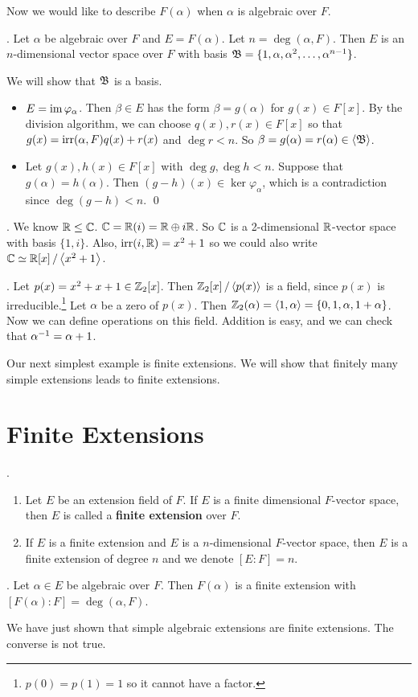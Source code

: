Now we would like to describe \(F(\alpha)\) when \(\alpha\) is algebraic over \(F\).

\thm. Let \(\alpha\) be algebraic over \(F\) and \(E = F(\alpha)\). Let \(n = \deg(\alpha, F)\). Then \(E\) is an \(n\)-dimensional vector space over \(F\) with basis \(\mathfrak{B} = \{1, \alpha, \alpha^2, \dots, \alpha^{n-1}\}\).

\pf We will show that \(\mathfrak{B}\) is a basis.
\begin{itemize}
    \item {} \(E = \operatorname{im} \varphi_\alpha\). Then \(\beta \in E\) has the form \(\beta = g(\alpha)\) for \(g(x) \in F[x]\). By the division algorithm, we can choose \(q(x), r(x) \in F[x]\) so that \(g(x) = \mathrm{irr}(\alpha, F) q(x) + r(x)\) and \(\deg r < n\). So \(\beta = g(\alpha) = r(\alpha) \in \left\langle \mathfrak{B} \right\rangle\).
    \item {} Let \(g(x), h(x) \in F[x]\) with \(\deg g, \deg h < n\). Suppose that \(g(\alpha) = h(\alpha)\). Then \((g-h)(x) \in \ker \varphi_\alpha\), which is a contradiction since \(\deg (g-h) < n\). \qed
\end{itemize}

\pagebreak

\ex. We know \(\mathbb{R} \leq \mathbb{C}\). \(\mathbb{C} = \mathbb{R}(i) = \mathbb{R} \oplus i\mathbb{R}\). So \(\mathbb{C}\) is a 2-dimensional \(\mathbb{R}\)-vector space with basis \(\{1, i\}\). Also, \(\mathrm{irr}(i, \mathbb{R}) = x^2 + 1\) so we could also write \(\mathbb{C} \simeq \mathbb{R}[x] \operatorname{/} \left\langle x^2 + 1 \right\rangle\).

\ex. Let \(p(x) = x^2 + x + 1 \in \mathbb{Z}_2[x]\). Then \(\mathbb{Z}_2[x] \operatorname{/} \left\langle p(x) \right\rangle\) is a field, since \(p(x)\) is irreducible.\footnote{\(p(0) = p(1) = 1\) so it cannot have a factor.} Let \(\alpha\) be a zero of \(p(x)\). Then \(\mathbb{Z}_2(\alpha) = \left\langle 1, \alpha \right\rangle = \left\{0, 1, \alpha, 1 + \alpha\right\}\). Now we can define operations on this field. Addition is easy, and we can check that \(\alpha^{-1} = \alpha + 1\).

\setcounter{topic}{30}

Our next simplest example is finite extensions. We will show that finitely many simple extensions leads to finite extensions.

\section*{Finite Extensions}

. 
\begin{enumerate}
    \item Let \(E\) be an extension field of \(F\). If \(E\) is a finite dimensional \(F\)-vector space, then \(E\) is called a \textbf{finite extension} over \(F\).

    \item If \(E\) is a finite extension and \(E\) is a \(n\)-dimensional \(F\)-vector space, then \(E\) is a finite extension of degree \(n\) and we denote \([E : F] = n\).
\end{enumerate}

\cor. Let \(\alpha \in E\) be algebraic over \(F\). Then \(F(\alpha)\) is a finite extension with \([F(\alpha) : F] = \deg(\alpha, F)\).

We have just shown that simple algebraic extensions are finite extensions. The converse is not true.

\pagebreak
